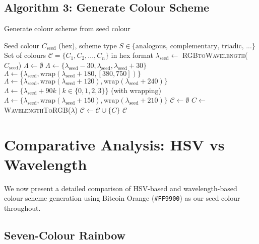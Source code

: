 \documentclass[12pt,a4paper]{article}
\newcommand{\wavelength}{\lambda}
\begin{document}
\subsection{Algorithm 3: Generate Colour Scheme}

\begin{algorithm}[ht]
\caption{Generate colour scheme from seed colour}
\label{alg:scheme}
\begin{algorithmic}[1]
\REQUIRE Seed colour $C_{\text{seed}}$ (hex), scheme type $S \in \{\text{analogous, complementary, triadic, ...}\}$
\ENSURE Set of colours $\mathcal{C} = \{C_1, C_2, ..., C_n\}$ in hex format
\STATE $\wavelength_{\text{seed}} \leftarrow$ \textsc{RGBtoWavelength}($C_{\text{seed}}$) 
\STATE $\Lambda \leftarrow \emptyset$ 
    \STATE $\Lambda \leftarrow \{\wavelength_{\text{seed}} - 30, \wavelength_{\text{seed}}, \wavelength_{\text{seed}} + 30\}$
    \STATE $\Lambda \leftarrow \{\wavelength_{\text{seed}}, \text{wrap}(\wavelength_{\text{seed}} + 180, [380, 750])\}$
    \STATE $\Lambda \leftarrow \{\wavelength_{\text{seed}}, \text{wrap}(\wavelength_{\text{seed}} + 120), \text{wrap}(\wavelength_{\text{seed}} + 240)\}$
    \STATE $\Lambda \leftarrow \{\wavelength_{\text{seed}} + 90k \mid k \in \{0,1,2,3\}\}$ (with wrapping)
    \STATE $\Lambda \leftarrow \{\wavelength_{\text{seed}}, \text{wrap}(\wavelength_{\text{seed}} + 150), \text{wrap}(\wavelength_{\text{seed}} + 210)\}$
\ENDIF
\STATE $\mathcal{C} \leftarrow \emptyset$
\FOR{each $\wavelength \in \Lambda$}
    \STATE $C \leftarrow$ \textsc{WavelengthToRGB}($\wavelength$) 
    \STATE $\mathcal{C} \leftarrow \mathcal{C} \cup \{C\}$
\ENDFOR
\RETURN $\mathcal{C}$
\end{algorithmic}
\end{algorithm}

\section{Comparative Analysis: HSV vs Wavelength}
\label{sec:comparison}

We now present a detailed comparison of HSV-based and wavelength-based colour scheme generation using Bitcoin Orange (\texttt{\#FF9900}) as our seed colour throughout.

\subsection{Seven-Colour Rainbow}
\end{document}
